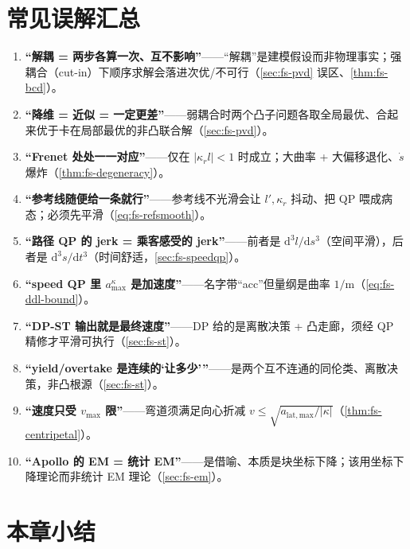 \section*{常见误解汇总}
\begin{enumerate}
  \item \textbf{“解耦 = 两步各算一次、互不影响”}——“解耦”是建模假设而非物理事实；强耦合（cut-in）下顺序求解会落进次优/不可行（\cref{sec:fs-pvd} 误区、\cref{thm:fs-bcd}）。
  \item \textbf{“降维 = 近似 = 一定更差”}——弱耦合时两个凸子问题各取全局最优、合起来优于卡在局部最优的非凸联合解（\cref{sec:fs-pvd}）。
  \item \textbf{“Frenet 处处一一对应”}——仅在 $|\kappa_r l|<1$ 时成立；大曲率 + 大偏移退化、$\dot s$ 爆炸（\cref{thm:fs-degeneracy}）。
  \item \textbf{“参考线随便给一条就行”}——参考线不光滑会让 $l',\kappa_r$ 抖动、把 QP 喂成病态；必须先平滑（\cref{eq:fs-refsmooth}）。
  \item \textbf{“路径 QP 的 jerk = 乘客感受的 jerk”}——前者是 $\mathrm{d}^3l/\mathrm{d}s^3$（空间平滑），后者是 $\mathrm{d}^3s/\mathrm{d}t^3$（时间舒适，\cref{sec:fs-speedqp}）。
  \item \textbf{“speed QP 里 $a^\kappa_{\max}$ 是加速度”}——名字带“acc”但量纲是曲率 $1/\mathrm{m}$（\cref{eq:fs-ddl-bound}）。
  \item \textbf{“DP-ST 输出就是最终速度”}——DP 给的是离散决策 + 凸走廊，须经 QP 精修才平滑可执行（\cref{sec:fs-st}）。
  \item \textbf{“yield/overtake 是连续的‘让多少’”}——是两个互不连通的同伦类、离散决策，非凸根源（\cref{sec:fs-st}）。
  \item \textbf{“速度只受 $v_{\max}$ 限”}——弯道须满足向心折减 $v\le\sqrt{a_{\mathrm{lat,max}}/|\kappa|}$（\cref{thm:fs-centripetal}）。
  \item \textbf{“Apollo 的 EM = 统计 EM”}——是借喻、本质是块坐标下降；该用坐标下降理论而非统计 EM 理论（\cref{sec:fs-em}）。
\end{enumerate}

\section*{本章小结}

